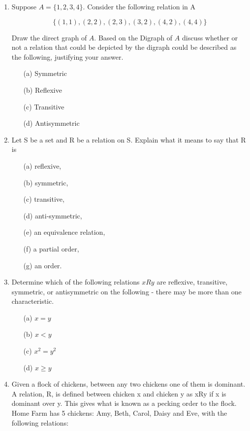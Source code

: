 \documentclass[]{report}
\begin{document}
\begin{enumerate}
\item 

Suppose $A = \{1,2,3,4\}$. Consider the following relation in A

\[ \{  (1,1),(2,2),(2,3),(3,2),(4,2),(4,4)\} \]

Draw the direct graph of $A$. Based on the Digraph of $A$ discuss whether or not a relation that could be depicted by the digraph could be described as the following, justifying your answer.

\begin{multicols}{2}
\begin{itemize}
\item[(a)] Symmetric
\item[(b)] Reflexive 
\item[(c)] Transitive
\item[(d)] Antisymmetric
\end{itemize}
\end{multicols}
\item Let S be a set and R be a relation on S. Explain what it means to say that R
is
\begin{multicols}{3}
\begin{itemize}
\item[(a)] reflexive,
\item[(b)] symmetric,
\item[(c)] transitive,
\item[(d)] anti-symmetric,
\item[(e)] an equivalence relation,
\item[(f)] a partial order,
\item[(g)] an order. 
\end{itemize}
\end{multicols}


\item 
Determine which of the following relations $ x R y$ are reflexive, transitive, symmetric, or antisymmetric on the following - there may be more than one characteristic. 
\begin{multicols}{2}
\begin{itemize} 
\item[(a)] $x = y$
\item[(b)] $x < y$
\item[(c)] $x^2 = y^2$
\item[(d)] $x \geq y$
\end{itemize}
\end{multicols}
\item 
Given a flock of chickens, between any two chickens one of them is
dominant. A relation, R, is defined between chicken x and chicken y as xRy if x is
dominant over y. This gives what is known as a pecking order to the flock. Home
Farm has 5 chickens: Amy, Beth, Carol, Daisy and Eve, with the following relations:


\end{enumerate}
\end{document}
